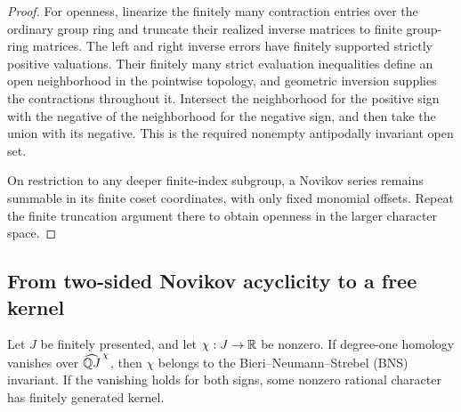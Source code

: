 \begin{proof}
For openness, linearize the finitely many contraction entries over
the ordinary group ring and truncate their realized inverse matrices
to finite group-ring matrices. The left and right inverse errors have
finitely supported strictly positive valuations. Their finitely many
strict evaluation inequalities define an open neighborhood in the
pointwise topology, and geometric inversion supplies the contractions
throughout it. Intersect the neighborhood for the positive sign with
the negative of the neighborhood for the negative sign, and then take
the union with its negative. This is the required nonempty antipodally
invariant open set.

On restriction to any deeper finite-index subgroup, a Novikov
series remains summable in its finite coset coordinates, with
only fixed monomial offsets.  Repeat the finite truncation
argument there to obtain openness in the larger character space.
\end{proof}

\subsection{From two-sided Novikov acyclicity to a free kernel}

\begin{lemma}\label{fill:bns}
Let \(J\) be finitely presented, and let \(\chi:J\to\mathbb R\) be nonzero.
If degree-one homology vanishes over
\(\widehat{\mathbb Q J}^{\,\chi}\), then \(\chi\) belongs to the Bieri--Neumann--Strebel (BNS)
invariant.  If the vanishing holds for both signs, some nonzero
rational character has finitely generated kernel.
\end{lemma}

